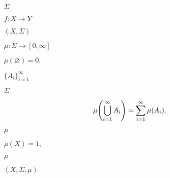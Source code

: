 \documentclass[10pt]{book}
\begin{document}
\begin{mdSnippets}
\begin{mdInlineSnippet}[025b3f94d79319f2067156076bf05243]%
$\Sigma$\end{mdInlineSnippet}%
\begin{mdInlineSnippet}[2385fde6b300ad088e0c2711c9da8a74]%
$f: X \to Y$\end{mdInlineSnippet}%
\begin{mdInlineSnippet}[4f63e1397362dfddde7f9605fc68fb64]%
$(X, \Sigma)$\end{mdInlineSnippet}%
\begin{mdInlineSnippet}%
$\mu: \Sigma \to [0, \infty]$\end{mdInlineSnippet}%
\begin{mdInlineSnippet}%
$\mu(\varnothing) = 0.$\end{mdInlineSnippet}%
\begin{mdInlineSnippet}[285e38d14735127a14e606e4b16c8dab]%
$\{A_i\}_{i=1}^\infty$\end{mdInlineSnippet}%
\begin{mdInlineSnippet}[025b3f94d79319f2067156076bf05243]%
$\Sigma$\end{mdInlineSnippet}%
\begin{mdDisplaySnippet}[8f71eb3be455c60b59d830519c7a0b97]%
\[%
\mu\qty(\bigcup_{i=1}^\infty A_i) = \sum_{i=1}^\infty \mu(A_i).
\]%
\end{mdDisplaySnippet}%
\begin{mdInlineSnippet}%
$\mu$\end{mdInlineSnippet}%
\begin{mdInlineSnippet}%
$\mu(X) = 1,$\end{mdInlineSnippet}%
\begin{mdInlineSnippet}%
$\mu$\end{mdInlineSnippet}%
\begin{mdInlineSnippet}[4429e97c6c5c5e3f564fdfd53852bb3b]%
$(X, \Sigma, \mu)$\end{mdInlineSnippet}%

\end{mdSnippets}
\end{document}
